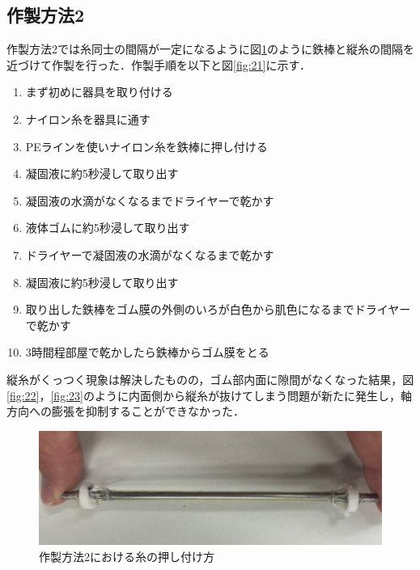 \newpage
\subsection{作製方法2}
作製方法2では糸同士の間隔が一定になるように図\ref{fig:20}のように鉄棒と縦糸の間隔を近づけて作製を行った．作製手順を以下と図\ref{fig:21}に示す．
\begin{enumerate}
  \item まず初めに器具を取り付ける
  \item ナイロン糸を器具に通す
  \item PEラインを使いナイロン糸を鉄棒に押し付ける
  \item 凝固液に約5秒浸して取り出す
  \item 凝固液の水滴がなくなるまでドライヤーで乾かす
  \item 液体ゴムに約5秒浸して取り出す
  \item ドライヤーで凝固液の水滴がなくなるまで乾かす
  \item 凝固液に約5秒浸して取り出す
  \item 取り出した鉄棒をゴム膜の外側のいろが白色から肌色になるまでドライヤーで乾かす
  \item 3時間程部屋で乾かしたら鉄棒からゴム膜をとる
\end{enumerate}


縦糸がくっつく現象は解決したものの，ゴム部内面に隙間がなくなった結果，図\ref{fig:22}，\ref{fig:23}のように内面側から縦糸が抜けてしまう問題が新たに発生し，軸方向への膨張を抑制することができなかった．

\begin{figure}[h]
  \centering  %
  \includegraphics[scale=0.2]{pic/19.jpg}
  \caption{作製方法2における糸の押し付け方}
  \label{fig:20}
\end{figure}

